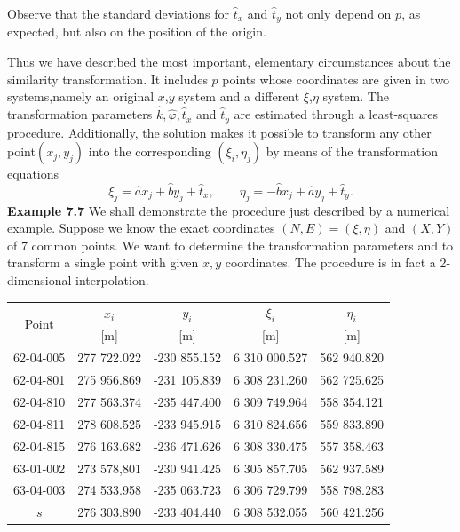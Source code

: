 Observe that the standard deviations for $\hat{t}_x$ and $\hat{t}_y$ not only depend on $p$, as expected, but also on the position of the origin.
\par
Thus we have described the most important, elementary circumstances about the similarity transformation. It includes $p$ points whose coordinates are given in two systems,namely an original $x$,$y$ system and a different $\xi$,$\eta$ system. The transformation parameters
$\hat{k}, \hat{\varphi}, \hat{t}_x$ and $\hat{t}_y$ are estimated through a least-squares procedure. Additionally, the solution makes it possible to transform any other point$(x_j,y_j)$ into the corresponding $(\xi_i,\eta_j)$ by means of the transformation equations
\begin{equation}
\xi_j
= \hat{a}x_j + \hat{b}y_{j} + \hat{t}_x,\qquad
\eta_j = -\hat{b}x_j + \hat{a}y_{j} + \hat{t}_y.
\end{equation}
\textbf{Example 7.7} We shall demonstrate the procedure just described by a numerical example.
Suppose we know the exact coordinates $(N, E) = (\xi, \eta)$ and $(X, Y)$ of 7 common points.
We want to determine the transformation parameters and to transform a single point with
given $x, y$ coordinates. The procedure is in fact a 2-dimensional interpolation.
\par
\begin{table}[htbp]
	\begin{tabular}{ccccc}
		\toprule
		\multirow{2}{*}{Point} & $x_i$ & $y_i$ & $\xi_{i}$ & $\eta_i$ \\
		{} &[m] & [m] & [m] & [m]\\
		\midrule
		62-04-005 &277 722.022  &-230 855.152 & 6 310 000.527 &562 940.820\\
		62-04-801 &275 956.869  &-231 105.839 & 6 308 231.260 &562 725.625\\
		62-04-810 &277 563.374  &-235 447.400 & 6 309 749.964 &558 354.121\\
		62-04-811 &278 608.525  &-233 945.915 & 6 310 824.656 &559 833.890\\
		62-04-815 &276 163.682  &-236 471.626 & 6 308 330.475 &557 358.463\\
		63-01-002 &273 578,801  &-230 941.425 & 6 305 857.705 &562 937.589\\
		63-04-003 &274 533.958  &-235 063.723 & 6 306 729.799 &558 798.283\\
		$s$       &276 303.890  &-233 404.440 & 6 308 532.055 &560 421.256\\
		\bottomrule
	\end{tabular}
\end{table}
